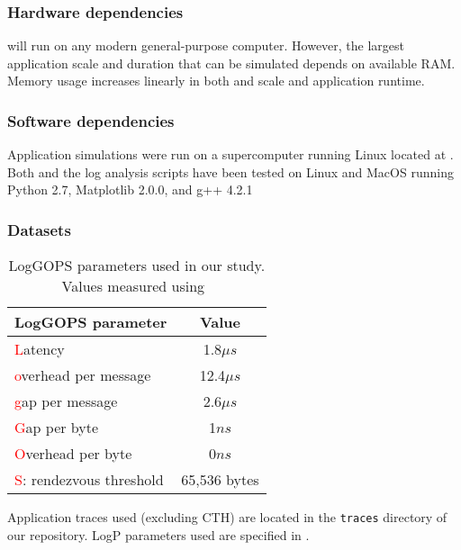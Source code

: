 \subsubsection{Hardware dependencies}

\LogGOPSim will run on any modern general-purpose computer. However, the
largest application scale and duration that can be simulated depends on
available RAM.  Memory usage increases linearly in both and scale and application
runtime.

\subsubsection{Software dependencies}

Application simulations were run on a supercomputer running Linux located at
.  Both \LogGOPSim and the log
analysis scripts have been tested on Linux and MacOS running Python 2.7,
Matplotlib 2.0.0, and g++ 4.2.1

\subsubsection{Datasets}

\begin{table}
\centering
\begin{tabular}{ l c }
\toprule
LogGOPS parameter & Value\\
\midrule
\textcolor{red}{L}atency                & 1.8$\mu s$ \\
\textcolor{red}{o}verhead per message   & 12.4$\mu s$ \\
\textcolor{red}{g}ap per message        & 2.6$\mu s$  \\
\textcolor{red}{G}ap per byte           & 1$ns$     \\
\textcolor{red}{O}verhead per byte      & 0$ns$     \\
\textcolor{red}{S}: rendezvous threshold  & 65,536 bytes \\
\bottomrule
\end{tabular}
\caption{
  LogGOPS parameters used in our study. Values measured using~\cite{netgauge-web}
}
\label{tab:logp}
\end{table}

Application traces used (excluding CTH) are located in the {\texttt{traces}} 
directory of our repository.  LogP parameters used are specified in .

